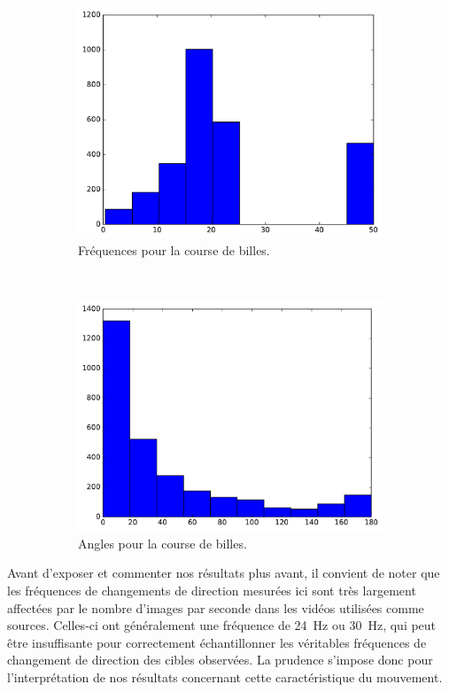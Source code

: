\begin{figure}[htb]
\begin{subfigure}[t]{\subImgWaStats}
			\includegraphics[width=\textwidth]{figures/ch3/bille_frequency}
			\caption{Fréquences pour la course de billes.}
			\label{fig:bille_frequency}
		\end{subfigure}
		~
		\begin{subfigure}[t]{\subImgWaStats}
			\centering
			\includegraphics[width=\textwidth]{figures/ch3/bille_angle}
			\caption{Angles pour la course de billes.}
			\label{fig:bille_angle}
		\end{subfigure}
		\caption[Histogrammes, dynamique moléculaire et course de billes]{}
		\label{fig:histAtomBille}
	\end{figure}

	Avant d'exposer et commenter nos résultats plus avant, il convient de noter que les fréquences de changements de direction mesurées ici sont très largement affectées par le nombre d'images par seconde dans les vidéos utilisées comme sources. Celles-ci ont généralement une fréquence de 24~Hz ou 30~Hz, qui peut être insuffisante pour correctement échantillonner les véritables fréquences de changement de direction des cibles observées. La prudence s'impose donc pour l'interprétation de nos résultats concernant cette caractéristique du mouvement.
	

